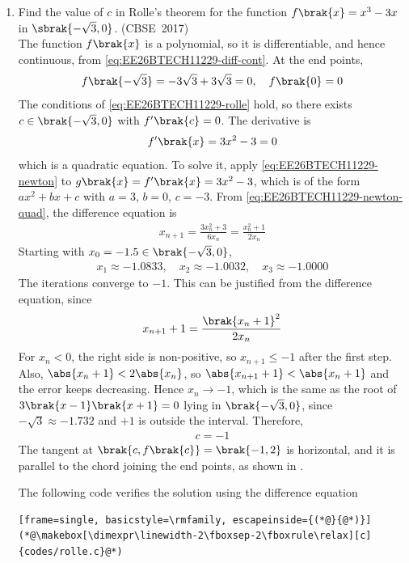 \begin{enumerate}[label=\thesubsection.\arabic*, ref=\thesubsection.\theenumi]
\item 
Find the value of $c$ in Rolle's theorem for the function $f\brak{x} = x^3 - 3x$ in $\sbrak{-\sqrt{3}, 0}$.
\hfill (CBSE~2017)
\\
\solution
The function $f\brak{x}$ is a polynomial, so it is differentiable, and hence continuous, from \eqref{eq:EE26BTECH11229-diff-cont}. At the end points,
\begin{align}
	f\brak{-\sqrt{3}} = -3\sqrt{3} + 3\sqrt{3} = 0, \quad f\brak{0} = 0
\end{align}
The conditions of \eqref{eq:EE26BTECH11229-rolle} hold, so there exists $c \in \brak{-\sqrt{3}, 0}$ with $f^{\prime}\brak{c} = 0$. The derivative is
\begin{align}
	f^{\prime}\brak{x} = 3x^2 - 3 = 0
\end{align}
which is a quadratic equation. To solve it, apply \eqref{eq:EE26BTECH11229-newton} to $g\brak{x} = f^{\prime}\brak{x} = 3x^2 - 3$, which is of the form $ax^2 + bx + c$ with $a = 3$, $b = 0$, $c = -3$. From \eqref{eq:EE26BTECH11229-newton-quad}, the difference equation is
\begin{align}
	x_{n+1} = \frac{3x_n^2 + 3}{6x_n} = \frac{x_n^2 + 1}{2x_n}
\end{align}
Starting with $x_0 = -1.5 \in \brak{-\sqrt{3}, 0}$,
\begin{align}
	x_1 \approx -1.0833, \quad x_2 \approx -1.0032, \quad x_3 \approx -1.0000
\end{align}
The iterations converge to $-1$. This can be justified from the difference equation, since
\begin{align}
	x_{n+1} + 1 = \frac{\brak{x_n + 1}^2}{2x_n}
\end{align}
For $x_n < 0$, the right side is non-positive, so $x_{n+1} \le -1$ after the first step. Also, $\abs{x_n + 1} < 2\abs{x_n}$, so $\abs{x_{n+1} + 1} < \abs{x_n + 1}$ and the error keeps decreasing. Hence $x_n \to -1$, which is the same as the root of $3\brak{x - 1}\brak{x + 1} = 0$ lying in $\brak{-\sqrt{3}, 0}$, since $-\sqrt{3} \approx -1.732$ and $+1$ is outside the interval. Therefore,
\begin{align}
	c = -1
\end{align}
The tangent at $\brak{c, f\brak{c}} = \brak{-1, 2}$ is horizontal, and it is parallel to the chord joining the end points, as shown in .

The following code verifies the solution using the difference equation
\begin{lstlisting}[frame=single, basicstyle=\rmfamily, escapeinside={(*@}{@*)}]
(*@\makebox[\dimexpr\linewidth-2\fboxsep-2\fboxrule\relax][c]{codes/rolle.c}@*)
\end{lstlisting}


\end{enumerate}
